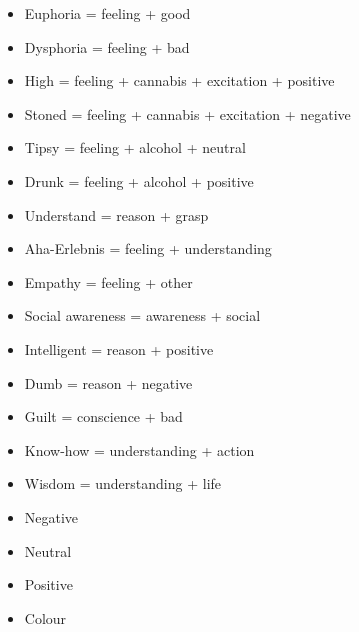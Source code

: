 \documentclass[a5,landscape]{article}
\begin{document}
{\begin{multicols}{4}
\begin{itemize}
\item   Euphoria = feeling + good 

\item   Dysphoria = feeling + bad 

\item   High = feeling + cannabis + excitation + positive 

\item   Stoned = feeling + cannabis + excitation + negative 

\item   Tipsy = feeling + alcohol + neutral 

\item   Drunk = feeling + alcohol + positive 

\item   Understand = reason + grasp 

\item   Aha-Erlebnis = feeling + understanding 

\item   Empathy = feeling + other 

\item   Social awareness = awareness + social 

\item   Intelligent = reason + positive 

\item   Dumb = reason + negative 

\item   Guilt = conscience + bad 

\item   Know-how = understanding + action 

\item   Wisdom = understanding + life 
\end{itemize}
\end{multicols}

\begin{multicols}{4}

\begin{itemize}
\item   Negative 

\item   Neutral  

\item   Positive  

\item   Colour 


\end{itemize}
\end{multicols}}
\end{document}
